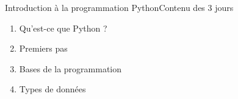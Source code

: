 \documentclass{beamer}
\begin{document}
    \begin{frame}{Introduction à la programmation Python}{Contenu des 3 jours}
            \begin{multicols}{3}
                \begin{tiny}
                    \begin{enumerate}
                        \item Qu'est-ce que Python ?
                        \item Premiers pas
                        \begin{itemize}
                        \end{itemize}

                        \item Bases de la programmation
                        \begin{itemize}
                        \end{itemize}

                        \item Types de données
                        \begin{itemize}
                        \end{itemize}


\end{enumerate}
\end{tiny}
\end{multicols}
\end{frame}
\end{document}
